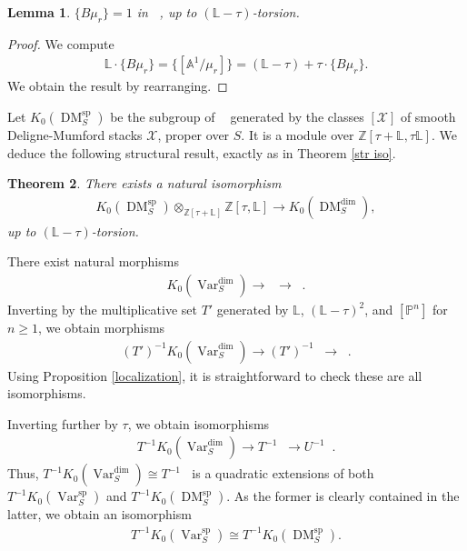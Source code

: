 \documentclass{amsart}
\newtheorem{thm}{Theorem}[section]
\newtheorem{lem}[thm]{Lemma}
\theoremstyle{definition}
\DeclareMathOperator{\Var}{Var}
\DeclareMathOperator{\spr}{sp}
\DeclareMathOperator{\DM}{DM}
\DeclareMathOperator{\Stk}{Stk}
\newcommand{\KdimS}{K_0(\Var_S^{\dim})}
\newcommand{\KsprS}{K_0(\Var_S^{\spr})}
\DeclareMathOperator{\KstkS}{K_0(\Stk_S^{\dim})}
\DeclareMathOperator{\Kdm}{K_0(\DM_k^{\dim})}
\DeclareMathOperator{\KdmS}{K_0(\DM_S^{\dim})}
\numberwithin{equation}{section}
\begin{document}
\begin{lem}\label{B unity}
  $\{ B \mu_r \} = 1$ in $\Kdm$, up to $(\mathbb{L}-\tau)$-torsion. 
\end{lem}

\begin{proof}
We compute
\begin{align*}
    \mathbb{L} \cdot \{ B \mu_r \} = \{ [\mathbb{A}^1 / \mu_r] \} = (\mathbb{L}-\tau) + \tau \cdot \{ B \mu_r \}.
\end{align*}
We obtain the result by rearranging.
\end{proof}

Let $K_0(\DM_S^{\spr})$ be the subgroup of $\KdmS$ generated by the classes $[\mathscr{X}]$ of smooth Deligne-Mumford stacks $\mathscr{X}$, proper over $S$. It is a module over $\mathbb{Z}[\tau+\mathbb{L}, \tau \mathbb{L}]$. We deduce the following structural result, exactly as in Theorem \ref{str iso}.


\begin{thm}\label{str iso dm}
There exists a natural isomorphism
\begin{align*}
    K_0(\DM_S^{\spr}) \otimes_{\mathbb{Z}[\tau+ \mathbb{L}]} \mathbb{Z}[\tau, \mathbb{L}] \rightarrow  K_0(\DM_S^{\dim}),
\end{align*}
up to $(\mathbb{L}-\tau)$-torsion.
\end{thm}

There exist natural morphisms
\begin{align*}
    \KdimS \rightarrow \KdmS \rightarrow \KstkS.
\end{align*}
Inverting by the multiplicative set $T'$ generated by $\mathbb{L}$, $(\mathbb{L}-\tau)^2$, and $[\mathbb{P}^n]$ for $n \geq 1$, we obtain morphisms
\begin{align*}
    (T')^{-1}\KdimS \rightarrow (T')^{-1}\KdmS \rightarrow \KstkS.
\end{align*}
Using Proposition \ref{localization}, it is straightforward to check these are all isomorphisms.

Inverting further by $\tau$, we obtain isomorphisms
\begin{align*}
    T^{-1}\KdimS \rightarrow T^{-1}\KdmS \rightarrow U^{-1}\KstkS.
\end{align*}
Thus, $T^{-1}\KdimS \cong T^{-1}\KdmS$ is a quadratic extensions of both $T^{-1}\KsprS$ and $T^{-1} K_0(\DM_S^{\spr})$. As the former is clearly contained in the latter, we obtain an isomorphism
\begin{align*}
    T^{-1}\KsprS \cong T^{-1} K_0(\DM_S^{\spr}).
\end{align*}
\end{document}
